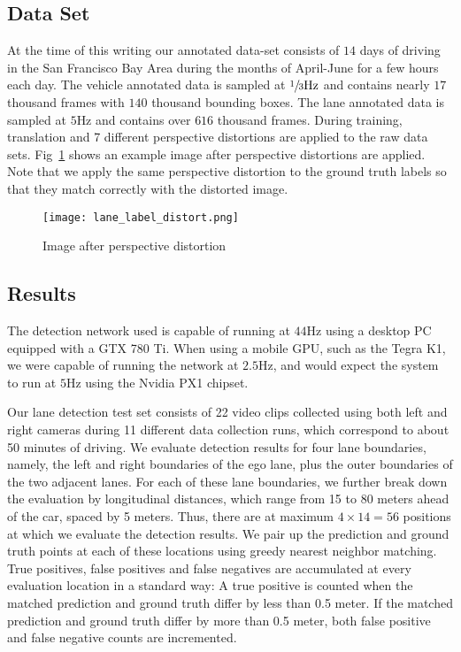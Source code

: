 \documentclass[journal]{IEEEtran}
\begin{document}
\subsection{Data Set}
At the time of this writing our annotated data-set consists of $14$ days of driving in the San Francisco Bay Area during the months of April-June for a few hours each day. The vehicle annotated data is sampled at $\sfrac{1}{3} \text{Hz}$ and contains nearly $17$ thousand frames with $140$ thousand bounding boxes. The lane annotated data is sampled at $5\text{Hz}$ and contains over $616$ thousand frames. During training, translation and 7 different perspective distortions are applied to the raw data sets. Fig~\ref{fig:lane-gt-distort} shows an example image after perspective distortions are applied. Note that we apply the same perspective distortion to the ground truth labels so that they match correctly with the distorted image.

\begin{figure}[tb]
  \centering
    \texttt{[image: lane\_label\_distort.png]}
 \caption{Image after perspective distortion}
 \label{fig:lane-gt-distort}
\end{figure}


\subsection{Results}
The detection network used is capable of running at $44$Hz using a desktop PC equipped with a GTX 780 Ti. When using a mobile GPU, such as the Tegra K1, we were capable of running the network at $2.5$Hz, and would expect the system to run at $5$Hz using the Nvidia PX1 chipset.

Our lane detection test set consists of 22 video clips collected using both left and right cameras during 11 different data collection runs, which correspond to about 50 minutes of driving. We evaluate detection results for four lane boundaries, namely, the left and right boundaries of the ego lane, plus the outer boundaries of the two adjacent lanes. For each of these lane boundaries, we further break down the evaluation by longitudinal distances, which range from 15 to 80 meters ahead of the car, spaced by 5 meters. Thus, there are at maximum $4\times14=56$ positions at which we evaluate the detection results. We pair up the prediction and ground truth points at each of these locations using greedy nearest neighbor matching. True positives, false positives and false negatives are accumulated at every evaluation location in a standard way: A true positive is counted when the matched prediction and ground truth differ by less than 0.5 meter. If the matched prediction and ground truth differ by more than 0.5 meter, both false positive and false negative counts are incremented.
\end{document}
